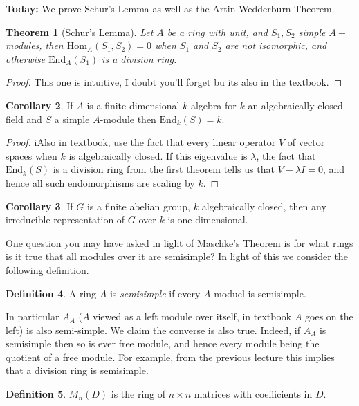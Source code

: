 \documentclass{article}
\newtheorem{theorem}{Theorem}[section]
\theoremstyle{definition}
\newtheorem{corollary}[theorem]{Corollary}
\newtheorem{definition}[theorem]{Definition}
\theoremstyle{remark}
\theoremstyle{plain}
\begin{document}
\textbf{Today:} We prove Schur's Lemma as well as the Artin-Wedderburn Theorem.

\begin{theorem}[Schur's Lemma]
	Let $A$ be a ring with unit, and $S_1, S_2$ simple $A-$modules, then $\text{Hom}_A(S_1, S_2) = 0$ when $S_1$ and $S_2$ are not isomorphic, and otherwise $\text{End}_A(S_1)$ is a division ring.
\end{theorem}
\begin{proof}
	This one is intuitive, I doubt you'll forget bu its also in the textbook.
\end{proof}

\begin{corollary}
	If $A$ is a finite dimensional $k$-algebra for $k$ an algebraically closed field and $S$ a simple $A$-module then $\text{End}_k(S) = k$.
\end{corollary}
\begin{proof}
	iAlso in textbook, use the fact that every linear operator $V$ of vector spaces when $k$ is algebraically closed.
	If this eigenvalue is $\lambda$, the fact that $\text{End}_k(S)$ is a division ring from the first theorem tells us that $V - \lambda I = 0$, and hence all such endomorphisms are scaling by $k$.
\end{proof}

\begin{corollary}
	If $G$ is a finite abelian group, $k$ algebraically closed, then any irreducible representation of $G$ over $k$ is one-dimensional.
\end{corollary}

One question you may have asked in light of Maschke's Theorem is for what rings is it true that all modules over it are semisimple?
In light of this we consider the following definition.

\begin{definition}
	A ring $A$ is \textit{semisimple} if every $A$-moduel is semisimple.
\end{definition}

In particular $A_A$ ($A$ viewed as a left module over itself, in textbook $A$ goes on the left) is also semi-simple.
We claim the converse is also true.
Indeed, if $A_A$ is semisimple then so is ever free module, and hence every module being the quotient of a free module.
For example, from the previous lecture this implies that a division ring is semisimple.

\begin{definition}
	$M_n(D)$ is the ring of $n \times n$ matrices with coefficients in $D$.
\end{definition}
\end{document}
